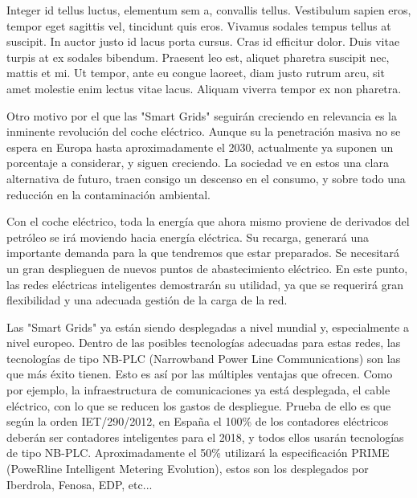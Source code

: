  Integer id tellus luctus, elementum sem a, convallis tellus. Vestibulum sapien eros, tempor eget sagittis vel, tincidunt quis eros. Vivamus sodales tempus tellus at suscipit. In auctor justo id lacus porta cursus. Cras id efficitur dolor. Duis vitae turpis at ex sodales bibendum. Praesent leo est, aliquet pharetra suscipit nec, mattis et mi. Ut tempor, ante eu congue laoreet, diam justo rutrum arcu, sit amet molestie enim lectus vitae lacus. Aliquam viverra tempor ex non pharetra.
 
 Otro motivo por el que las "Smart Grids" seguirán creciendo en relevancia es la inminente revolución del coche eléctrico. Aunque su la penetración masiva no se espera en Europa hasta aproximadamente el 2030, actualmente ya suponen un porcentaje a considerar, y siguen creciendo. La sociedad ve en estos una clara alternativa de futuro, traen consigo un descenso en el consumo, y sobre todo una reducción en la contaminación ambiental.
 
 Con el coche eléctrico, toda la energía que ahora mismo proviene de derivados del petróleo se irá moviendo hacia energía eléctrica. Su recarga, generará una importante demanda para la que tendremos que estar preparados. Se necesitará un gran desplieguen de nuevos puntos de abastecimiento eléctrico. En este punto, las redes eléctricas inteligentes demostrarán su utilidad, ya que se requerirá gran flexibilidad y una adecuada gestión de la carga de la red. 
 
 Las "Smart Grids" ya están siendo desplegadas a nivel mundial y, especialmente a nivel europeo. Dentro de las posibles tecnologías adecuadas para estas redes, las tecnologías de tipo NB-PLC (Narrowband Power Line Communications) son las que más éxito tienen. Esto es así por las múltiples ventajas que ofrecen. Como por ejemplo, la infraestructura de comunicaciones ya está desplegada, el cable eléctrico, con lo que se reducen los gastos de despliegue. Prueba de ello es que según la orden IET/290/2012, en España el 100\% de los contadores eléctricos deberán ser contadores inteligentes para el 2018, y todos ellos usarán tecnologías de tipo NB-PLC. Aproximadamente el 50\% utilizará la especificación PRIME (PoweRline Intelligent Metering Evolution), estos son los desplegados por Iberdrola, Fenosa, EDP, etc...
 
 
 
 
 
 
 
 
 